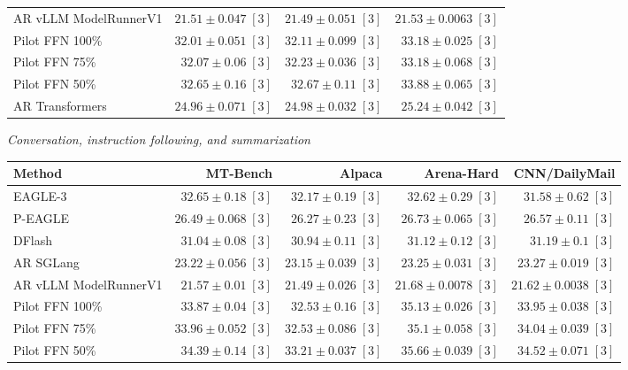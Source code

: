\documentclass[conference,onecolumn]{IEEEtran}
\begin{document}
\begin{table}[!htp]
\begin{tabular}{@{}>{\raggedright\arraybackslash}p{3.7cm}rrr@{}}
AR \textperiodcentered{} vLLM ModelRunnerV1 & \(\mathbf{21.51} \pm 0.047\;[3]\) & \(\mathbf{21.49} \pm 0.051\;[3]\) & \(\mathbf{21.53} \pm 0.0063\;[3]\) \\
Pilot FFN 100\% & \(32.01 \pm 0.051\;[3]\) & \(32.11 \pm 0.099\;[3]\) & \(33.18 \pm 0.025\;[3]\) \\
Pilot FFN 75\% & \(32.07 \pm 0.06\;[3]\) & \(32.23 \pm 0.036\;[3]\) & \(33.18 \pm 0.068\;[3]\) \\
Pilot FFN 50\% & \(32.65 \pm 0.16\;[3]\) & \(32.67 \pm 0.11\;[3]\) & \(33.88 \pm 0.065\;[3]\) \\
AR \textperiodcentered{} Transformers & \(24.96 \pm 0.071\;[3]\) & \(24.98 \pm 0.032\;[3]\) & \(25.24 \pm 0.042\;[3]\) \\
\bottomrule
\end{tabular}\par\medskip
\textit{Conversation, instruction following, and summarization}\par\smallskip
\begin{tabular}{@{}>{\raggedright\arraybackslash}p{3.7cm}rrrr@{}}
\toprule
Method & MT-Bench & Alpaca & Arena-Hard & CNN/DailyMail \\
\midrule
EAGLE-3 & \(32.65 \pm 0.18\;[3]\) & \(32.17 \pm 0.19\;[3]\) & \(32.62 \pm 0.29\;[3]\) & \(31.58 \pm 0.62\;[3]\) \\
P-EAGLE & \(26.49 \pm 0.068\;[3]\) & \(26.27 \pm 0.23\;[3]\) & \(26.73 \pm 0.065\;[3]\) & \(26.57 \pm 0.11\;[3]\) \\
DFlash & \(31.04 \pm 0.08\;[3]\) & \(30.94 \pm 0.11\;[3]\) & \(31.12 \pm 0.12\;[3]\) & \(31.19 \pm 0.1\;[3]\) \\
AR \textperiodcentered{} SGLang & \(23.22 \pm 0.056\;[3]\) & \(23.15 \pm 0.039\;[3]\) & \(23.25 \pm 0.031\;[3]\) & \(23.27 \pm 0.019\;[3]\) \\
AR \textperiodcentered{} vLLM ModelRunnerV1 & \(\mathbf{21.57} \pm 0.01\;[3]\) & \(\mathbf{21.49} \pm 0.026\;[3]\) & \(\mathbf{21.68} \pm 0.0078\;[3]\) & \(\mathbf{21.62} \pm 0.0038\;[3]\) \\
Pilot FFN 100\% & \(33.87 \pm 0.04\;[3]\) & \(32.53 \pm 0.16\;[3]\) & \(35.13 \pm 0.026\;[3]\) & \(33.95 \pm 0.038\;[3]\) \\
Pilot FFN 75\% & \(33.96 \pm 0.052\;[3]\) & \(32.53 \pm 0.086\;[3]\) & \(35.1 \pm 0.058\;[3]\) & \(34.04 \pm 0.039\;[3]\) \\
Pilot FFN 50\% & \(34.39 \pm 0.14\;[3]\) & \(33.21 \pm 0.037\;[3]\) & \(35.66 \pm 0.039\;[3]\) & \(34.52 \pm 0.071\;[3]\) \\

\end{tabular}
\end{table}
\end{document}

